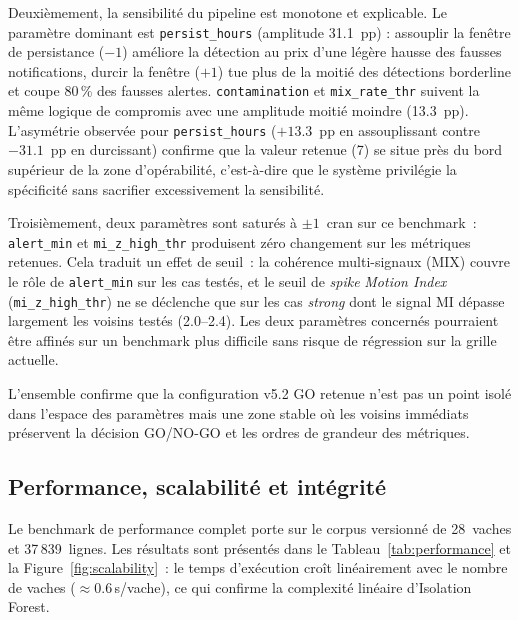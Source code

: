 Deuxièmement, la sensibilité du pipeline est monotone et explicable.
Le paramètre dominant est \texttt{persist\_hours} (amplitude 31.1~pp) : assouplir la
fenêtre de persistance ($-1$) améliore la détection au prix d'une légère hausse des
fausses notifications, durcir la fenêtre ($+1$) tue plus de la moitié des détections
borderline et coupe 80\,\% des fausses alertes. \texttt{contamination} et
\texttt{mix\_rate\_thr} suivent la même logique de compromis avec une amplitude
moitié moindre (13.3~pp). L'asymétrie observée pour \texttt{persist\_hours} ($+13.3$~pp
en assouplissant contre $-31.1$~pp en durcissant) confirme que la valeur retenue (7)
se situe près du \og bord supérieur \fg{} de la zone d'opérabilité, c'est-à-dire que
le système privilégie la spécificité sans sacrifier excessivement la sensibilité.

Troisièmement, deux paramètres sont saturés à $\pm 1$~cran sur ce
benchmark~: \texttt{alert\_min} et \texttt{mi\_z\_high\_thr} produisent zéro changement
sur les métriques retenues. Cela traduit un effet de seuil~: la cohérence multi-signaux
(MIX) couvre le rôle de \texttt{alert\_min} sur les cas testés, et le seuil de
\textit{spike} \textit{Motion Index} (\texttt{mi\_z\_high\_thr}) ne se déclenche que sur les
cas \textit{strong} dont le signal MI dépasse largement les voisins testés (2.0--2.4).
Les deux paramètres concernés pourraient être affinés sur un benchmark plus difficile sans
risque de régression sur la grille actuelle.

L'ensemble confirme que la configuration v5.2 GO retenue n'est pas un point
isolé dans l'espace des paramètres mais une zone stable où les voisins immédiats
préservent la décision GO/NO-GO et les ordres de grandeur des métriques.

\FloatBarrier
\subsection{Performance, scalabilité et intégrité}
\label{subsec:scalabilite}

Le benchmark de performance complet porte sur le corpus versionné de 28~vaches et
37\,839~lignes. Les résultats sont présentés dans le Tableau~\ref{tab:performance} et la
Figure~\ref{fig:scalability}~: le temps d'exécution croît linéairement avec le nombre
de vaches ($\approx$0.6\,s/vache), ce qui confirme la complexité linéaire d'Isolation
Forest.

